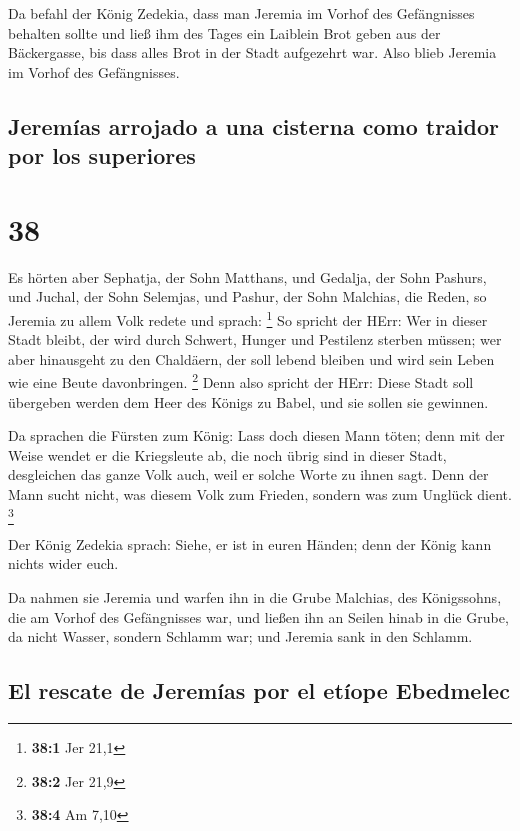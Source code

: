  Da befahl der König Zedekia, dass man Jeremia im Vorhof
des Gefängnisses behalten sollte und ließ ihm des Tages ein Laiblein
Brot geben aus der Bäckergasse, bis dass alles Brot in der Stadt
aufgezehrt war. Also blieb Jeremia im Vorhof des Gefängnisses.

\hypertarget{jeremuxedas-arrojado-a-una-cisterna-como-traidor-por-los-superiores}{%
\subsection{Jeremías arrojado a una cisterna como traidor por los
superiores}\label{jeremuxedas-arrojado-a-una-cisterna-como-traidor-por-los-superiores}}

\hypertarget{section-37}{%
\section{38}\label{section-37}}

 Es hörten aber Sephatja, der Sohn Matthans, und Gedalja,
der Sohn Pashurs, und Juchal, der Sohn Selemjas, und Pashur, der Sohn
Malchias, die Reden, so Jeremia zu allem Volk redete und sprach:
\footnote{\textbf{38:1} Jer 21,1}  So spricht der HErr:
Wer in dieser Stadt bleibt, der wird durch Schwert, Hunger und Pestilenz
sterben müssen; wer aber hinausgeht zu den Chaldäern, der soll lebend
bleiben und wird sein Leben wie eine Beute davonbringen. \footnote{\textbf{38:2}
  Jer 21,9}  Denn also spricht der HErr: Diese Stadt soll
übergeben werden dem Heer des Königs zu Babel, und sie sollen sie
gewinnen.

 Da sprachen die Fürsten zum König: Lass doch diesen Mann
töten; denn mit der Weise wendet er die Kriegsleute ab, die noch übrig
sind in dieser Stadt, desgleichen das ganze Volk auch, weil er solche
Worte zu ihnen sagt. Denn der Mann sucht nicht, was diesem Volk zum
Frieden, sondern was zum Unglück dient. \footnote{\textbf{38:4} Am 7,10}

 Der König Zedekia sprach: Siehe, er ist in euren Händen;
denn der König kann nichts wider euch.

 Da nahmen sie Jeremia und warfen ihn in die Grube
Malchias, des Königssohns, die am Vorhof des Gefängnisses war, und
ließen ihn an Seilen hinab in die Grube, da nicht Wasser, sondern
Schlamm war; und Jeremia sank in den Schlamm.

\hypertarget{el-rescate-de-jeremuxedas-por-el-etuxedope-ebedmelec}{%
\subsection{El rescate de Jeremías por el etíope
Ebedmelec}\label{el-rescate-de-jeremuxedas-por-el-etuxedope-ebedmelec}}

